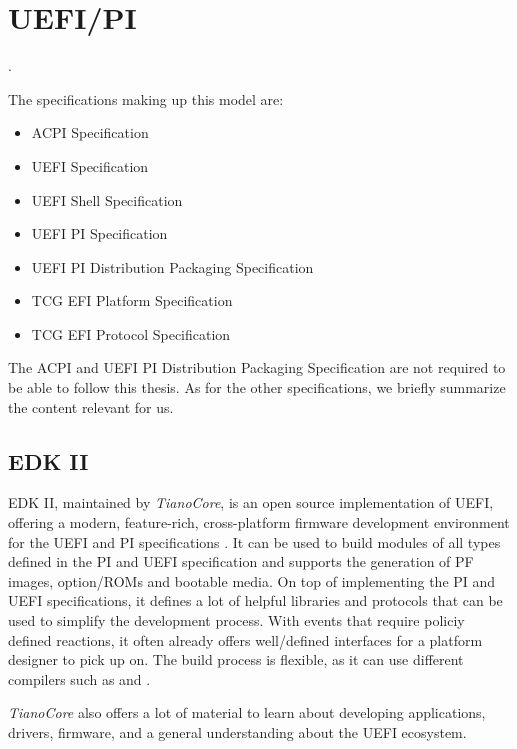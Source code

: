 
\chapter{\acs{UEFI}/\acs{PI}}
\label{sec:uefi-pi}

.

The specifications making up this model are:

\begin{itemize}
    \item \acs{ACPI} Specification
    \item \acs{UEFI} Specification
    \item \acs{UEFI} Shell Specification
    \item \acs{UEFI} \acs{PI} Specification
    \item \acs{UEFI} \acs{PI} Distribution Packaging Specification
    \item \acs{TCG} \acs{EFI} Platform Specification
    \item \acs{TCG} \acs{EFI} Protocol Specification
\end{itemize}

The \ac{ACPI} and \ac{UEFI} \ac{PI} Distribution Packaging Specification are not required to be able to follow this thesis.
As for the other specifications, we briefly summarize the content relevant for us.


\clearpage


\clearpage


\clearpage


\section{\acs{EDK} II}

\ac{EDK} II, maintained by \emph{TianoCore}, is an open source implementation of \ac{UEFI}, offering a modern, feature-rich, cross-platform firmware development environment for the \ac{UEFI} and \ac{PI} specifications \cite{tianocore}.
It can be used to build modules of all types defined in the \ac{PI} and \ac{UEFI} specification and supports the generation of \ac{PF} images, option\-/\acp{ROM} and bootable media.
On top of implementing the \ac{PI} and \ac{UEFI} specifications, it defines a lot of helpful libraries and protocols that can be used to simplify the development process.
With events that require policiy defined reactions, it often already offers well\-/defined interfaces for a platform designer to pick up on.
The build process is flexible, as it can use different compilers such as  and .

\emph{TianoCore} also offers a lot of material to learn about developing applications, drivers, firmware, and a general understanding about the \ac{UEFI} ecosystem.